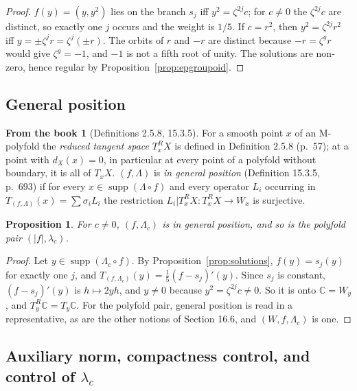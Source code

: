 \documentclass[11pt,a4paper]{article}
\theoremstyle{plain}
\newtheorem{proposition}[theorem]{Proposition}
\theoremstyle{definition}
\newtheorem{recall}[theorem]{From the book}
\theoremstyle{remark}
\newcommand{\C}{\mathbb{C}}
\newcommand{\abs}[1]{\lvert #1\rvert}
\newcommand{\supp}{\operatorname{supp}}
\begin{document}
\begin{proof}
$f(y)=(y,y^2)$ lies on the branch $s_j$ iff $y^2=\zeta^{2j}c$; for $c\neq0$ the $\zeta^{2j}c$ are
distinct, so exactly one $j$ occurs and the weight is $1/5$. If $c=r^2$, then $y^2=\zeta^{2j}r^2$ iff
$y=\pm\zeta^jr=\zeta^j(\pm r)$. The orbits of $r$ and $-r$ are distinct because $-r=\zeta^gr$ would give
$\zeta^g=-1$, and $-1$ is not a fifth root of unity. The solutions are non-zero, hence regular by
Proposition~\ref{prop:epgroupoid}.
\end{proof}

\subsection{General position}\label{sec:genpos}

\begin{recall}[Definitions 2.5.8, 15.3.5]
For a smooth point $x$ of an M-polyfold the \emph{reduced tangent space} $T^R_xX$ is defined in
Definition 2.5.8 (p.~57); at a point with $d_X(x)=0$, in particular at every point of a polyfold without
boundary, it is all of $T_xX$. $(f,\Lambda)$ is \emph{in general position} (Definition 15.3.5, p.~693) if
for every $x\in\supp(\Lambda\circ f)$ and every operator $L_i$ occurring in
$T_{(f,\Lambda)}(x)=\sum\sigma_iL_i$ the restriction $L_i|T^R_xX\colon T^R_xX\to W_x$ is surjective.
\end{recall}

\begin{proposition}\label{prop:genpos}
For $c\neq0$, $(f,\Lambda_c)$ is in general position, and so is the polyfold pair $(\abs f,\lambda_c)$.
\end{proposition}

\begin{proof}
Let $y\in\supp(\Lambda_c\circ f)$. By Proposition~\ref{prop:solutions}, $f(y)=s_j(y)$ for exactly one
$j$, and $T_{(f,\Lambda_c)}(y)=\frac15(f-s_j)'(y)$. Since $s_j$ is constant, $(f-s_j)'(y)$ is
$h\mapsto2yh$, and $y\neq0$ because $y^2=\zeta^{2j}c\neq0$. So it is onto $\C=W_y$, and
$T^R_y\C=T_y\C$. For the polyfold pair, general position is read in a representative, as are the other
notions of Section 16.6, and $(W,f,\Lambda_c)$ is one.
\end{proof}

\subsection{Auxiliary norm, compactness control, and control of \texorpdfstring{$\lambda_c$}{lambda}}
\end{document}

